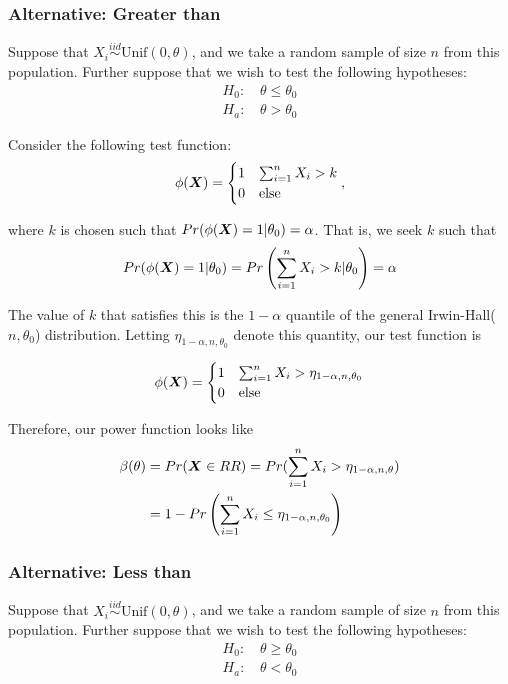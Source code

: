 \documentclass[]{article}
\newcommand{\bfX}{\mbox{\boldmath $X$}}
\begin{document}
\subsubsection{Alternative: Greater than}

Suppose that $X_i \stackrel{iid}{\sim} \text{Unif}(0, \theta)$, and we take a random sample of size $n$ from this population. Further suppose that we wish to test the following hypotheses:
\[
\begin{split}
\text{$H_0$: }& \theta \leq \theta_0 \\
\text{$H_a$: }& \theta > \theta_0
\end{split}
\]

Consider the following test function:
\[
\phi(\bfX) = \begin{cases}
1 & \sum_{i=1}^n X_i > k \\
0 & \text{else}
\end{cases},
\]

where $k$ is chosen such that $Pr(\phi(\bfX) = 1|\theta_0) = \alpha$. That is, we seek $k$ such that
\[
Pr(\phi(\bfX) = 1|\theta_0) = Pr\left(\sum_{i=1}^n X_i > k |\theta_0\right) = \alpha
\]

The value of $k$ that satisfies this is the $1 - \alpha$ quantile of the general Irwin-Hall($n, \theta_0$) distribution. Letting $\eta_{1-\alpha, n, \theta_0}$ denote this quantity, our test function is

\[
\phi(\bfX) = \begin{cases}
1 & \sum_{i=1}^n X_i > \eta_{1-\alpha, n, \theta_0}\\
0 & \text{else}
\end{cases}
\]

Therefore, our power function looks like
\[
\begin{split}
\beta(\theta) &= Pr(\bfX \in RR) = Pr(\sum_{i=1}^n X_i > \eta_{1-\alpha, n, \theta}) \\
&= 1 - Pr\left(\sum_{i=1}^n X_i \leq \eta_{1-\alpha, n, \theta_0}\right)
\end{split}
\]

\subsubsection{Alternative: Less than}

Suppose that $X_i \stackrel{iid}{\sim} \text{Unif}(0, \theta)$, and we take a random sample of size $n$ from this population. Further suppose that we wish to test the following hypotheses:
\[
\begin{split}
\text{$H_0$: }& \theta \geq \theta_0 \\
\text{$H_a$: }& \theta < \theta_0
\end{split}
\]
\end{document}
